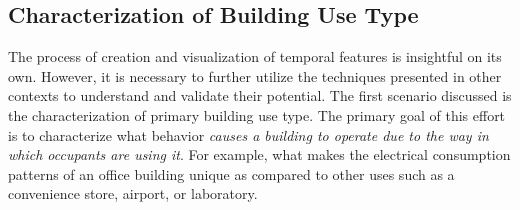 \subsection{Characterization of Building Use Type}
\label{sec:results_usetype}

The process of creation and visualization of temporal features is insightful on its own. However, it is necessary to further utilize the techniques presented in other contexts to understand and validate their potential. The first scenario discussed is the characterization of primary building use type. The primary goal of this effort is to characterize what behavior \emph{causes a building to operate due to the way in which occupants are using it}. For example, what makes the electrical consumption patterns of an office building unique as compared to other uses such as a convenience store, airport, or laboratory.